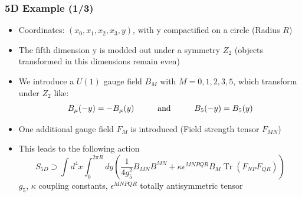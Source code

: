 \documentclass[aspectratio=1610, 9pt]{beamer}
\DeclareMathOperator{\Tr}{Tr}
\begin{document}


\begin{frame}
	\frametitle{5D Example (1/3)}
	
	\begin{itemize}
		\item Coordinates: $(x_0, x_1, x_2, x_3, y)$, with y compactified on a circle (Radius $R$) 
		\item The fifth dimension y is modded out under a symmetry $Z_2$ (objects transformed in this dimensions remain even)
		\item We introduce a $U(1)$ gauge field $B_M$ with $M = 0,1,2,3,5$, which transform under $Z_2$ like:
		\begin{equation*}
			B_{\mu}(-y) = -B_{\mu}(y)\hspace{1 cm}\text{and}\hspace{1cm}  B_5(-y) = B_5(y)
		\end{equation*}	
		\item One additional gauge field $F_M$ is introduced (Field strength tensor $F_{MN}$)
		\item This leads to the following action
		\begin{equation*}
			S_{5D} \supset \int d^4x \int_0^{2\pi R} dy \left( \frac{1}{4 g_5^2} B_{MN} B^{MN} + \kappa \epsilon^{MNPQR} B_M \Tr(F_{NP} F_{QR}) \right)
		\end{equation*}
		$g_5$, $\kappa$ coupling constants, $\epsilon^{MNPQR}$ totally antisymmetric tensor
	\end{itemize}
\end{frame}
\end{document}
